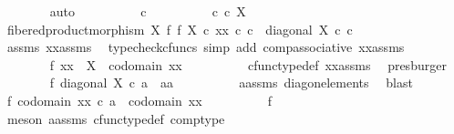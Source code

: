 \begin{isabellebody}
\ \ \ \ \ \ \isamarkupfalse%
\ auto\isanewline
\ \ \ \ \ \ \ \ \isamarkupfalse%
\ c\isanewline
\ \ \ \ \ \ \ \ \isamarkupfalse%
\ {\isachardoublequoteopen}c\ {\isasymin}\isactrlsub c\ X{\isachardoublequoteclose}\isanewline
\ \ \ \ \ \ \ \ \isamarkupfalse%
\ \isamarkupfalse%
\ {\isachardoublequoteopen}fibered{\isacharunderscore}{\kern0pt}product{\isacharunderscore}{\kern0pt}morphism\ X\ f\ f\ X\ {\isasymcirc}\isactrlsub c\ xx\ {\isasymcirc}\isactrlsub c\ c\ {\isacharequal}{\kern0pt}\ diagonal\ X\ {\isasymcirc}\isactrlsub c\ c{\isachardoublequoteclose}\isanewline
\ \ \ \ \ \ \ \ \ \ \isamarkupfalse%
\ assms\ xx{\isacharunderscore}{\kern0pt}assms\ \isamarkupfalse%
\ {\isacharparenleft}{\kern0pt}typecheck{\isacharunderscore}{\kern0pt}cfuncs{\isacharcomma}{\kern0pt}\ simp\ add{\isacharcolon}{\kern0pt}\ comp{\isacharunderscore}{\kern0pt}associative{}\ xx{\isacharunderscore}{\kern0pt}assms{\isacharparenleft}{\kern0pt}{}{\isacharparenright}{\kern0pt}{\isacharparenright}{\kern0pt}\isanewline
\ \ \ \ \ \ \isamarkupfalse%
\isanewline
\ \ \ \ \ \ \isamarkupfalse%
\ f{}{\isacharcolon}{\kern0pt}\ {\isachardoublequoteopen}xx\ {\isacharcolon}{\kern0pt}\ X\ {\isasymrightarrow}\ codomain\ xx{\isachardoublequoteclose}\isanewline
\ \ \ \ \ \ \ \ \isamarkupfalse%
\ cfunc{\isacharunderscore}{\kern0pt}type{\isacharunderscore}{\kern0pt}def\ xx{\isacharunderscore}{\kern0pt}assms\ \isamarkupfalse%
\ presburger\isanewline
\ \ \ \ \ \ \isamarkupfalse%
\ f{}{\isacharcolon}{\kern0pt}\ {\isachardoublequoteopen}diagonal\ X\ {\isasymcirc}\isactrlsub c\ a\ {\isacharequal}{\kern0pt}\ {\isasymlangle}a{\isacharcomma}{\kern0pt}a{\isasymrangle}{\isachardoublequoteclose}\isanewline
\ \ \ \ \ \ \ \ \isamarkupfalse%
\ a{\isacharunderscore}{\kern0pt}assms\ diag{\isacharunderscore}{\kern0pt}on{\isacharunderscore}{\kern0pt}elements\ \isamarkupfalse%
\ blast\isanewline
\ \ \ \ \ \ \isamarkupfalse%
\ f{}{\isacharcolon}{\kern0pt}\ {\isachardoublequoteopen}codomain\ {\isacharparenleft}{\kern0pt}xx\ {\isasymcirc}\isactrlsub c\ a{\isacharparenright}{\kern0pt}\ {\isacharequal}{\kern0pt}\ codomain\ xx{\isachardoublequoteclose}\isanewline
\ \ \ \ \ \ \ \ \isamarkupfalse%
\ f{}\ \isamarkupfalse%
\ {\isacharparenleft}{\kern0pt}meson\ a{\isacharunderscore}{\kern0pt}assms\ cfunc{\isacharunderscore}{\kern0pt}type{\isacharunderscore}{\kern0pt}def\ comp{\isacharunderscore}{\kern0pt}type{\isacharparenright}{\kern0pt}\isanewline

\end{isabellebody}
